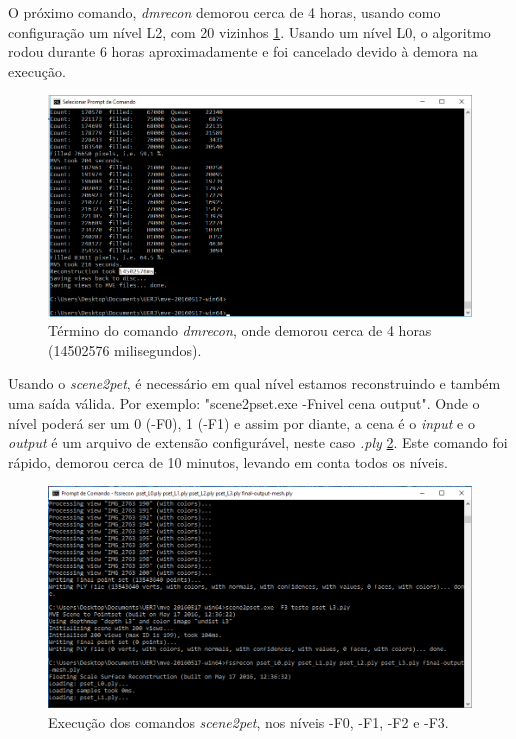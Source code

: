 O próximo comando, \emph{dmrecon} demorou cerca de 4 horas, usando como configuração um nível L2, com 20 vizinhos \ref{fig:MVEDenseRecon}. Usando um nível L0, o algoritmo rodou durante 6 horas aproximadamente e foi cancelado devido à demora na execução. 

\begin{figure}[!h]
	\centering
	\includegraphics[width=0.8\linewidth]{figs/umvetempo.png}
	\caption{%
	Término do comando \emph{dmrecon}, onde demorou cerca de 4 horas (14502576 milisegundos).
	}\label{fig:MVEDenseRecon}
\end{figure} 

Usando o \emph{scene2pet}, é necessário em qual nível estamos reconstruindo e também uma saída válida. Por exemplo: "scene2pset.exe -Fnivel cena output". Onde o nível poderá ser um 0 (-F0), 1 (-F1) e assim por diante, a cena é o \emph{input} e o \emph{output} é um arquivo de extensão configurável, neste caso \emph{.ply} \ref{fig:MVEScene2Pet}. Este comando foi rápido, demorou cerca de 10 minutos, levando em conta todos os níveis.

\begin{figure}[!h]
	\centering
	\includegraphics[width=0.8\linewidth]{figs/mvemesh.png}
	\caption{%
	Execução dos comandos \emph{scene2pet}, nos níveis -F0, -F1, -F2 e -F3.
	}\label{fig:MVEScene2Pet}
\end{figure} 

